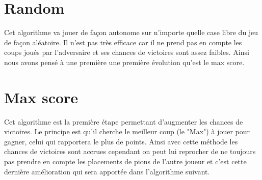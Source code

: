 \documentclass{report}
\begin{document}
		\section{Random}
		Cet algorithme va jouer de façon autonome sur n'importe quelle case libre du jeu de façon aléatoire. Il n'est pas très efficace car il ne prend pas en compte les coups joués par l'adversaire et ses chances de victoires sont assez faibles. Ainsi nous avons pensé à une première une première évolution qu'est le max score.
		\section{Max score}
		Cet algorithme est la première étape permettant d'augmenter les chances de victoires. Le principe est qu'il cherche le meilleur coup (le "Max") à jouer pour gagner, celui qui rapportera le plus de points. Ainsi avec cette méthode les chances de victoires sont accrues cependant on peut lui reprocher de ne toujours pas prendre en compte les placements de pions de l'autre joueur et c'est cette dernière amélioration qui sera apportée dans l'algorithme suivant. 
\end{document}
